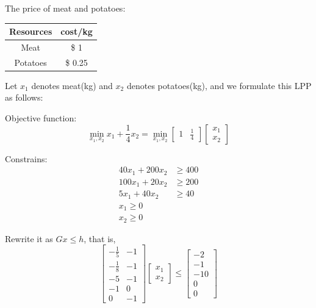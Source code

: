 \vspace{0.3cm}
The price of meat and potatoes:
\begin{center}
	\begin{tabular}{|c|c|}
		\hline 
		Resources&cost/kg\\
		\hline  
		Meat &\$ 1\\
		\hline 
		Potatoes &\$ 0.25\\
		\hline 
	\end{tabular}
\end{center}

Let $x_1$ denotes meat(kg) and $x_2$ denotes potatoes(kg), and we formulate this LPP as follows:

Objective function:
\begin{equation*}
	\min_{x_1, x_2} x_1 + \frac{1}{4}x_2 = 
	\min_{x_1, x_2}
	\begin{bmatrix}
		1 & \frac{1}{4}
	\end{bmatrix}
	\begin{bmatrix}
		x_1\\
		x_2
	\end{bmatrix}
\end{equation*}

Constrains:
\begin{align*}
	40x_1 + 200x_2 &\geq 400\\
	100x_1 + 20x_2 &\geq 200\\
	5x_1 + 40x_2 &\geq 40\\
	x_1 \geq 0\\
	x_2 \geq 0
\end{align*}


Rewrite it as $Gx\leq h$, that is,
\begin{equation*}
	\begin{bmatrix}
		-\frac{1}{5} & -1\\
		-\frac{1}{8} & -1\\
		-5 & -1\\
		-1 & 0\\
		0 & -1
	\end{bmatrix}
	\begin{bmatrix}
		x_1\\
		x_2
	\end{bmatrix}\leq
	\begin{bmatrix}
		-2\\
		-1\\
		-10\\
		0\\
		0
	\end{bmatrix}
\end{equation*}


